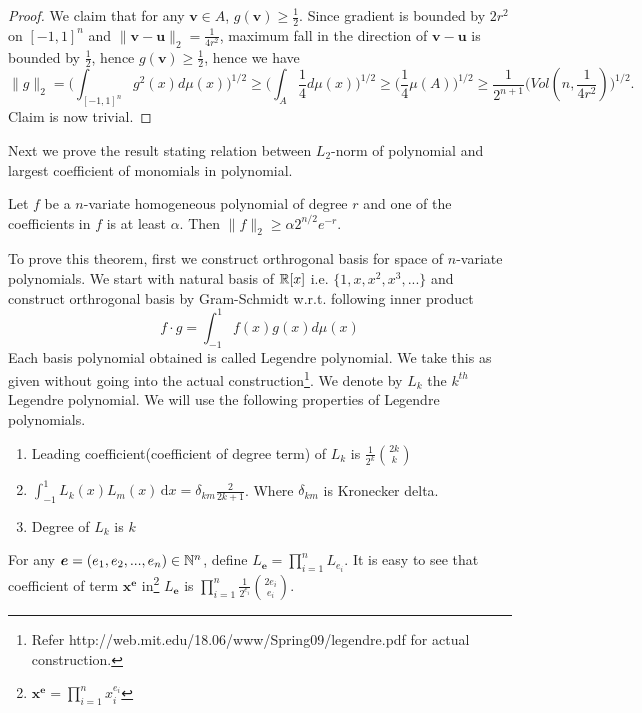 {\begin{proof}
We claim that for any $\bm v\in A$, $g(\bm v)\ge \frac{1}{2}$. Since gradient is bounded by $2r^2$ on $[-1,1]^n$ and $\|\bm v-\bm u\|_2=\frac{1}{4r^2}$, maximum fall in the direction of $\bm v-\bm u$ is bounded by $\frac{1}{2}$, hence $g(\bm v) \ge \frac{1}{2}$, hence we have
$$
\|g\|_2=\Bigg(\int_{[-1,1]^n} g^2(x)d\mu(x)\Bigg)^{1/2} \ge \Bigg(\int_A \frac{1}{4} d\mu(x)\Bigg)^{1/2}\ge \Big(\frac{1}{4}\mu(A)\Big)^{1/2} \ge \frac{1}{2^{n+1}}\Big(Vol(n,\frac{1}{4r^2})\Big)^{1/2}
.$$
Claim is now trivial.
\end{proof}
Next we prove the result stating relation between $L_2$-norm of polynomial and largest coefficient of monomials in polynomial.
\begin{theorem}
Let $f$ be a $n$-variate homogeneous polynomial of degree $r$ and one of the coefficients in $f$ is at least $\alpha$. Then $\|f\|_2 \ge \alpha 2^{n/2}e^{-r}$.
\end{theorem}
\thmpara
To prove this theorem, first we construct orthrogonal basis for space of $n$-variate polynomials. We start with natural basis of $\mathbb{R}[x]$ i.e. $\{1,x,x^2,x^3,...\}$ and construct orthrogonal basis by Gram-Schmidt w.r.t. following inner product
$$
f\cdot g = \int_{-1}^1f(x)g(x)d\mu(x)
$$
Each basis polynomial obtained is called Legendre polynomial. We take this as given without going into the actual construction\footnote{Refer http://web.mit.edu/18.06/www/Spring09/legendre.pdf for actual construction.}. We denote by $L_k$ the $k^{th}$ Legendre polynomial. We will use the following properties of Legendre polynomials.
\begin{enumerate}
\item Leading coefficient(coefficient of degree term) of $L_k$ is $\frac{1}{2^k}{2k \choose k}$
\item ${\displaystyle \int_{-1}^{1}L_{k}(x)L_{m}(x)\,\mathrm {d} x=\delta_{km}\frac{2}{2k+1}}$. Where $\delta_{km}$ is Kronecker delta.
\item Degree of $L_k$ is $k$
\end{enumerate}
\npara

For any $\bm e=(e_1,e_2,...,e_n)\in \mathbb{N}^n$, define $L_{\bm e} = \prod_{i=1}^{n}L_{e_i}$. It is easy to see that coefficient of term $\bm x^{\bm e}$ in\footnote{$\bm x^{\bm e} = \prod _{i=1}^n x_i^{e_i}$} $L_{\bm e}$ is $\prod_{i=1}^n\frac{1}{2^{e_i}}{2e_i \choose e_i}$.

}
